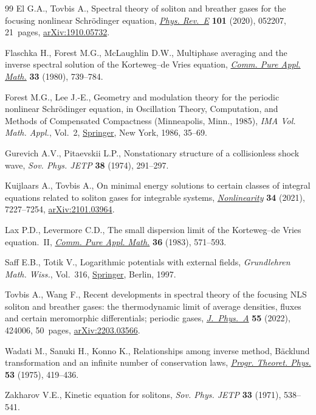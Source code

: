 \documentclass[pdftex]{sigma}
\numberwithin{equation}{section}
\begin{document}
\begin{thebibliography}{99}
El G.A., Tovbis A., Spectral theory of soliton and breather gases for the
 focusing nonlinear {S}chr\"odinger equation, \href{https://doi.org/10.1103/PhysRevE.101.052207}{\textit{Phys. Rev.~E}}
 \textbf{101} (2020), 052207, 21~pages, \href{https://arxiv.org/abs/1910.05732}{arXiv:1910.05732}.

Flaschka H., Forest M.G., McLaughlin D.W., Multiphase averaging and the inverse
 spectral solution of the {K}orteweg--de {V}ries equation, \href{https://doi.org/10.1002/cpa.3160330605}{\textit{Comm. Pure
 Appl. Math.}} \textbf{33} (1980), 739--784.

Forest M.G., Lee J.-E., Geometry and modulation theory for the periodic
 nonlinear {S}chr\"odinger equation, in Oscillation Theory, Computation, and
 Methods of Compensated Compactness ({M}inneapolis, {M}inn., 1985),
 \textit{IMA Vol. Math. Appl.}, Vol.~2, \href{https://doi.org/10.1007/978-1-4613-8689-6_3}{Springer}, New York, 1986, 35--69.

Gurevich A.V., Pitaevskii L.P., Nonstationary structure of a collisionless
 shock wave, \textit{Sov. Phys. JETP} \textbf{38} (1974), 291--297.

Kuijlaars A., Tovbis A., On minimal energy solutions to certain classes of
 integral equations related to soliton gases for integrable systems,
 \href{https://doi.org/10.1088/1361-6544/ac20a5}{\textit{Nonlinearity}} \textbf{34} (2021), 7227--7254, \href{https://arxiv.org/abs/2101.03964}{arXiv:2101.03964}.

Lax P.D., Levermore C.D., The small dispersion limit of the {K}orteweg--de
 {V}ries equation.~{II}, \href{https://doi.org/10.1002/cpa.3160360503}{\textit{Comm. Pure Appl. Math.}} \textbf{36} (1983),
 571--593.

Saff E.B., Totik V., Logarithmic potentials with external fields,
 \textit{Grundlehren Math. Wiss.}, Vol.~316, \href{https://doi.org/10.1007/978-3-662-03329-6}{Springer}, Berlin, 1997.

Tovbis A., Wang F., Recent developments in spectral theory of the focusing
 {NLS} soliton and breather gases: the thermodynamic limit of average
 densities, fluxes and certain meromorphic differentials; periodic gases,
 \href{https://doi.org/10.1088/1751-8121/ac97d0}{\textit{J.~Phys.~A}} \textbf{55} (2022), 424006, 50~pages,
 \href{https://arxiv.org/abs/2203.03566}{arXiv:2203.03566}.

Wadati M., Sanuki H., Konno K., Relationships among inverse method,
 {B}\"acklund transformation and an infinite number of conservation laws,
 \href{https://doi.org/10.1143/PTP.53.419}{\textit{Progr. Theoret. Phys.}} \textbf{53} (1975), 419--436.

Zakharov V.E., Kinetic equation for solitons, \textit{Sov. Phys. JETP}
 \textbf{33} (1971), 538--541.

\end{thebibliography}\LastPageEnding
\end{document}
